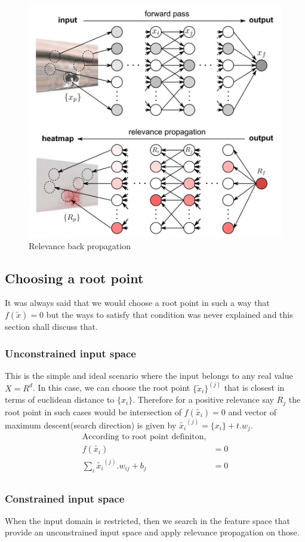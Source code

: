 \documentclass{article}
\begin{document}
	\begin{figure}[H]
		\centering
		\includegraphics[width=0.65\linewidth]{relevance_bp}
		\caption{Relevance back propagation}
		\label{fig:relevance_bp}
	\end{figure}
	
	\subsection{Choosing a root point}
	It was always said that we would choose a root point in such a way that $f(\tilde{x}) = 0$ but the ways to satisfy that condition was never explained and this section shall discuss that.
	\subsubsection{Unconstrained input space}
	This is the simple and ideal scenario where the input belongs to any real value $X = R^d$. In this case, we can choose the root point $\{ \tilde{x}_i\}^{(j)}$ that is closest in terms of euclidean distance to $\{x_i\}$. Therefore for a positive relevance say $R_j$ the root point in such cases would be intersection of $f(\tilde{x_i}) = 0$ and vector of maximum descent(search direction) is given by $\tilde{x_i}^{(j)} = \{x_i\} + t.w_j$.
	\begin{align}
		\text{According to root point definiton,} & \nonumber \\
		f(\tilde{x_i}) &= 0   \nonumber \\
		\sum_{i} \tilde{x_i}^{(j)}.w_{ij} + b_j &= 0 \nonumber \\
	\end{align}
	\subsubsection{Constrained input space}
	When the input domain is restricted, then we search in the feature space that provide an unconstrained input space and apply relevance propagation on those.
	
	
	
	
\end{document}
